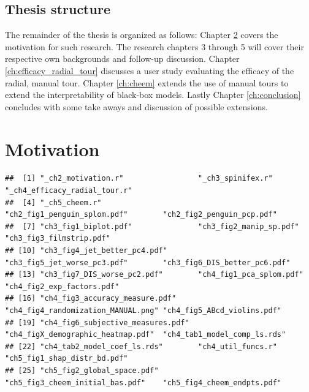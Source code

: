 \documentclass{template/monashthesis}
\begin{document}
\hypertarget{thesis-structure}{%
\section{Thesis structure}\label{thesis-structure}}

The remainder of the thesis is organized as follows: Chapter \ref{ch:motivation} covers the motivation for such research. The research chapters 3 through 5 will cover their respective own backgrounds and follow-up discussion. Chapter \ref{ch:efficacy_radial_tour} discusses a user study evaluating the efficacy of the radial, manual tour. Chapter \ref{ch:cheem} extends the use of manual tours to extend the interpretability of black-box models. Lastly Chapter \ref{ch:conclusion} concludes with some take aways and discussion of possible extensions.

\hypertarget{ch:motivation}{%
\chapter{Motivation}\label{ch:motivation}}

\begin{Shaded}
\begin{Highlighting}[]
\SpecialCharTok{::}\SpecialCharTok{$}\NormalTok{(}
   \DocumentationTok{\#\#\# }
   \NormalTok{)}

\NormalTok{(}\NormalTok{)}
\end{Highlighting}
\end{Shaded}

\begin{verbatim}
##  [1] "_ch2_motivation.r"                 "_ch3_spinifex.r"                   "_ch4_efficacy_radial_tour.r"      
##  [4] "_ch5_cheem.r"                      "ch2_fig1_penguin_splom.pdf"        "ch2_fig2_penguin_pcp.pdf"         
##  [7] "ch3_fig1_biplot.pdf"               "ch3_fig2_manip_sp.pdf"             "ch3_fig3_filmstrip.pdf"           
## [10] "ch3_fig4_jet_better_pc4.pdf"       "ch3_fig5_jet_worse_pc3.pdf"        "ch3_fig6_DIS_better_pc6.pdf"      
## [13] "ch3_fig7_DIS_worse_pc2.pdf"        "ch4_fig1_pca_splom.pdf"            "ch4_fig2_exp_factors.pdf"         
## [16] "ch4_fig3_accuracy_measure.pdf"     "ch4_fig4_randomization_MANUAL.png" "ch4_fig5_ABcd_violins.pdf"        
## [19] "ch4_fig6_subjective_measures.pdf"  "ch4_figX_demographic_heatmap.pdf"  "ch4_tab1_model_comp_ls.rds"       
## [22] "ch4_tab2_model_coef_ls.rds"        "ch4_util_funcs.r"                  "ch5_fig1_shap_distr_bd.pdf"       
## [25] "ch5_fig2_global_space.pdf"         "ch5_fig3_cheem_initial_bas.pdf"    "ch5_fig4_cheem_endpts.pdf"
\end{verbatim}
\end{document}

